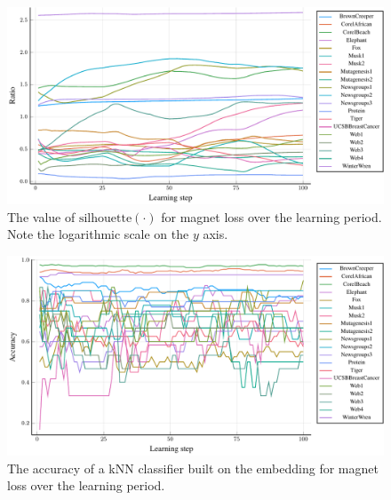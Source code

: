 \begin{figure}[h]
  \centering
  \includegraphics[width=\textwidth]{images/magnet-toy/ratio/magnet-toy-ratio.pdf}
  \caption{The value of \( \mathrm{silhouette} \left( \cdot \right) \) for magnet loss over the learning period. Note the logarithmic scale on the \( y \) axis.}\label{fig:magnet-toy-ratio}
\end{figure}

\begin{figure}[h]
  \centering
  \includegraphics[width=\textwidth]{images/magnet-toy/accuracy/magnet-toy-accuracy.pdf}
  \caption{The accuracy of a kNN classifier built on the embedding for magnet loss over the learning period.}\label{fig:magnet-toy-accuracy}
\end{figure}

